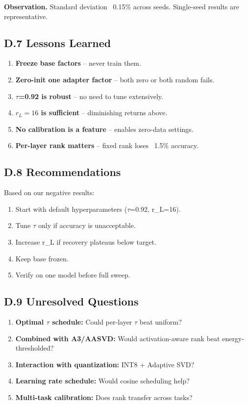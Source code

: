 \textbf{Observation.} Standard deviation ~0.15\% across seeds. Single-seed results 
are representative.

\subsection{D.7 Lessons Learned}

\begin{enumerate}
\item \textbf{Freeze base factors} -- never train them.
\item \textbf{Zero-init one adapter factor} -- both zero or both random fails.
\item \textbf{$\tau$=0.92 is robust} -- no need to tune extensively.
\item \textbf{$r_L=16$ is sufficient} -- diminishing returns above.
\item \textbf{No calibration is a feature} -- enables zero-data settings.
\item \textbf{Per-layer rank matters} -- fixed rank loses ~1.5\% accuracy.

\end{enumerate}
\subsection{D.8 Recommendations}

Based on our negative results:

\begin{enumerate}
\item Start with default hyperparameters ($\tau$=0.92, r\_L=16).
\item Tune $\tau$ only if accuracy is unacceptable.
\item Increase r\_L if recovery plateaus below target.
\item Keep base frozen.
\item Verify on one model before full sweep.

\end{enumerate}
\subsection{D.9 Unresolved Questions}

\begin{enumerate}
\item \textbf{Optimal $\tau$ schedule:} Could per-layer $\tau$ beat uniform?
\item \textbf{Combined with A3/AASVD:} Would activation-aware rank beat
  energy-thresholded?
\item \textbf{Interaction with quantization:} INT8 + Adaptive SVD?
\item \textbf{Learning rate schedule:} Would cosine scheduling help?
\item \textbf{Multi-task calibration:} Does rank transfer across tasks?
\end{enumerate}


